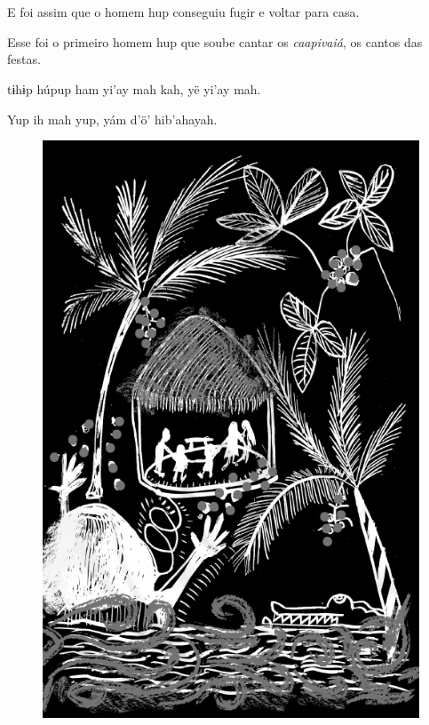 \chapter*{}

\mbox{}\vspace*{\fill}

E foi assim que
o homem hup
conseguiu fugir e
voltar para casa.

Esse foi o primeiro
homem hup que
soube cantar
os \textit{caapivaiá}, os
cantos das festas.

\bigskip

tɨhɨp húpup ham
yi’ay mah kah, yë
yi’ay mah.

Yup ih mah yup, yám
d’ö’ hib’ahayah.

\vspace*{\fill}

\begin{figure}
\vspace*{-1.2cm}
\hspace*{-2.2cm}\includegraphics[width=138mm]{./imgs/img8.jpg}
\end{figure}

